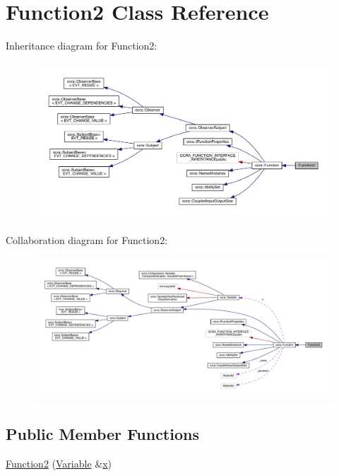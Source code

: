 \hypertarget{classFunction2}{}\section{Function2 Class Reference}
\label{classFunction2}


Inheritance diagram for Function2\+:\nopagebreak
\begin{figure}[H]
\begin{center}
\leavevmode
\includegraphics[width=350pt]{d3/dd4/classFunction2__inherit__graph}
\end{center}
\end{figure}


Collaboration diagram for Function2\+:\nopagebreak
\begin{figure}[H]
\begin{center}
\leavevmode
\includegraphics[width=350pt]{dc/dc4/classFunction2__coll__graph}
\end{center}
\end{figure}
\subsection*{Public Member Functions}
\begin{DoxyCompactItemize}
\item 
\hyperlink{classFunction2_ad907d2408853a2d278f87293abfcdf47}{Function2} (\hyperlink{classocra_1_1Variable}{Variable} \&\hyperlink{classocra_1_1Function_a28825886d1f149c87b112ec2ec1dd486}{x})
\end{DoxyCompactItemize}
